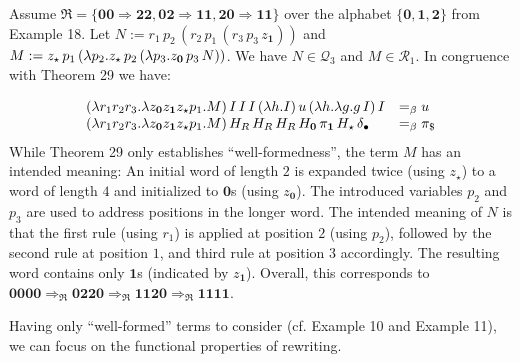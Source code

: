 \documentclass[10pt,a4paper]{amsart}
\begin{document}
Assume $\mathfrak{R}=\{\mathbf{0}\mathbf{0}\Rightarrow\mathbf{2}\mathbf{2},\mathbf{0}%
\mathbf{2}\Rightarrow\mathbf{1}\mathbf{1},\mathbf{2}\mathbf{0}\Rightarrow%
\mathbf{1}\mathbf{1}\}$ over the alphabet $\{\mathbf{0},\mathbf{1},\mathbf{2}\}$ from Example 18. Let $N:=r_{1}\,p_{2}\,(r_{2}\,p_{1}\,(r_{3}\,p_{3}\,z_{\mathbf{1}}))$ and $M:=z_{\star}\,p_{1}\,(\lambda p_{2}.z_{\star}\,p_{2}\,(\lambda p_{3}.z_{%
\mathbf{0}}\,p_{3}\,N))$. We have $N\in\mathcal{Q}_{3}$ and $M\in\mathcal{R}_{1}$. In congruence with Theorem 29 we have:\par
    \[\begin{array}[]{ll}(\lambda r_{1}r_{2}r_{3}.\lambda z_{\mathbf{0}}z_{\mathbf{1%
}}z_{\star}p_{1}.M)\,I\,I\,I\,(\lambda h.I)\,u\,(\lambda h.\lambda g.g\,I)\,I&%
=_{\beta}u\\
(\lambda r_{1}r_{2}r_{3}.\lambda z_{\mathbf{0}}z_{\mathbf{1}}z_{\star}p_{1}.M)%
\,H_{R}\,H_{R}\,H_{R}\,H_{\mathbf{0}}\,\pi_{\mathbf{1}}\,H_{\star}\,\delta_{%
\bullet}&=_{\beta}\pi_{\$}\end{array}\]    
While Theorem 29 only establishes “well-formedness”, the term $M$ has an intended meaning: An initial word of length $2$ is expanded twice (using $z_{\star}$) to a word of length $4$ and initialized to $\mathbf{0}$s (using $z_{\mathbf{0}}$). The introduced variables $p_{2}$ and $p_{3}$ are used to address positions in the longer word. The intended meaning of $N$ is that the first rule (using $r_{1}$) is applied at position $2$ (using $p_{2}$), followed by the second rule at position $1$, and third rule at position $3$ accordingly. The resulting word contains only $\mathbf{1}$s (indicated by $z_{\mathbf{1}}$). Overall, this corresponds to $\mathbf{0}\mathbf{0}\mathbf{0}\mathbf{0}\Rightarrow_{\mathfrak{R}}\mathbf{0}%
\mathbf{2}\mathbf{2}\mathbf{0}\Rightarrow_{\mathfrak{R}}\mathbf{1}\mathbf{1}%
\mathbf{2}\mathbf{0}\Rightarrow_{\mathfrak{R}}\mathbf{1}\mathbf{1}\mathbf{1}%
\mathbf{1}$.\par
 
 
 
 
Having only “well-formed” terms to consider (cf. Example 10 and Example 11), we can focus on the functional properties of rewriting.\par
 
 
 
\end{document}
